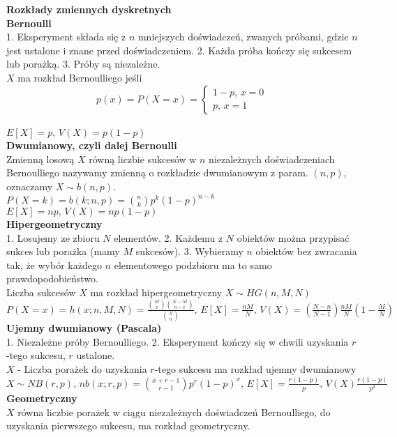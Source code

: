 \documentclass[10pt,landscape,a4paper,notitlepage]{article}
\begin{document}
\begin{multicols*}{4}
        \noindent\textbf{\large Rozkłady zmiennych dyskretnych}\\
        \textbf{Bernoulli}\\
        1. Eksperyment składa się z $n$ mniejszych doświadczeń, zwanych próbami,
        gdzie $n$ jest ustalone i znane przed doświadczeniem.
        2. Każda próba kończy się sukcesem lub porażką.
        3. Próby są niezależne.\\
        $X$ ma rozkład Bernoulliego jeśli
        \[
            p(x)=P(X=x)=
            \begin{cases}
                1-p,\,x=0\\
                p,\,x=1
            \end{cases}
        \]\\
        $E[X]=p,\,V(X)=p(1-p)$\\
        \textbf{Dwumianowy, czyli dalej Bernoulli}\\
        Zmienną losową $X$ równą liczbie sukcesów w $n$ niezależnych doświadczeniach Bernoulliego nazywamy zmienną o rozkładzie dwumianowym z param. $(n,p)$, oznaczamy $X\sim b(n,p)$.\\
        $P(X=k)=b(k;n,p)=\binom{n}{k}p^k(1-p)^{n-k}$\\
        $E[X]=np,\,V(X)=np(1-p)$\\
        \textbf{Hipergeometryczny}\\
        1. Losujemy ze zbioru $N$ elementów.
        2. Każdemu z $N$ obiektów można przypisać sukces lub porażka (mamy $M$ sukcesów).
        3. Wybieramy $n$ obiektów bez zwracania tak, że wybór każdego $n$ elementowego podzbioru ma to samo prawdopodobieństwo.\\
        Liczba sukcesów $X$ ma rozkład hipergeometryczny $X\sim HG(n,M,N)$
        $P(X=x)=h(x;n,M,N)=\frac{\binom{M}{x}\binom{N-M}{n-x}}{\binom{N}{n}},\,E[X]=\frac{nM}{N},\,V(X)=\left(\frac{N-n}{N-1}\right)\frac{nM}{N}\left(1-\frac{M}{N}\right)$\\
        \textbf{Ujemny dwumianowy (Pascala)}\\
        1. Niezależne próby Bernoulliego. 2. Eksperyment kończy się w chwili uzyskania $r$-tego sukcesu, $r$ ustalone.\\
        $X$ - Liczba porażek do uzyskania $r$-tego sukcesu ma rozkład ujemny dwumianowy
        $X\sim NB(r,p),\,nb(x;r,p)=\binom{x+r-1}{r-1}p^r(1-p)^x,\,E[X]=\frac{r(1-p)}{p},\,V(X)\frac{r(1-p)}{p^2}$\\
        \textbf{Geometryczny}\\
        $X$ równa liczbie porażek w ciągu niezależnych doświadczeń Bernoulliego, do uzyskania pierwszego sukcesu, ma rozkład geometryczny.\\

\end{multicols*}
\end{document}
